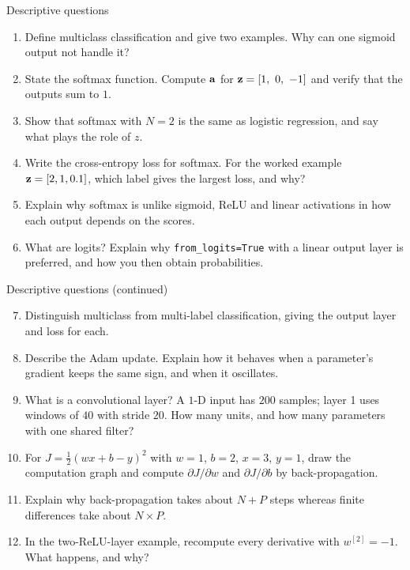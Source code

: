 \documentclass[aspectratio=169,10pt]{beamer}
\begin{document}
\begin{frame}{Descriptive questions}
  \footnotesize
  \begin{enumerate}
    \item Define multiclass classification and give two examples. Why can one sigmoid
          output not handle it? \hfill{}
    \item State the softmax function. Compute $\mathbf{a}$ for $\vz=[1,\ 0,\ -1]$ and verify that
          the outputs sum to $1$. \hfill{}
    \item Show that softmax with $N=2$ is the same as logistic regression, and say what
          plays the role of $z$. \hfill{}
    \item Write the cross-entropy loss for softmax. For the worked example
          $\mathbf{z}=[2,1,0.1]$, which label gives the largest loss, and why? \hfill{}
    \item Explain why softmax is unlike sigmoid, ReLU and linear activations in how each
          output depends on the scores. \hfill{}
    \item What are logits? Explain why \texttt{from\_logits=True} with a linear output layer
          is preferred, and how you then obtain probabilities. \hfill{}
  \end{enumerate}
\end{frame}

\begin{frame}{Descriptive questions (continued)}
  \footnotesize
  \begin{enumerate}\setcounter{enumi}{6}
    \item Distinguish multiclass from multi-label classification, giving the output layer
          and loss for each. \hfill{}
    \item Describe the Adam update. Explain how it behaves when a parameter's gradient
          keeps the same sign, and when it oscillates. \hfill{}
    \item What is a convolutional layer? A $1$-D input has $200$ samples; layer 1 uses
          windows of $40$ with stride $20$. How many units, and how many parameters with one
          shared filter? \hfill{}
    \item For $J=\tfrac12(wx+b-y)^2$ with $w=1$, $b=2$, $x=3$, $y=1$, draw the computation
          graph and compute $\partial J/\partial w$ and $\partial J/\partial b$ by
          back-propagation. \hfill{}
    \item Explain why back-propagation takes about $N+P$ steps whereas finite differences
          take about $N\times P$. \hfill{}
    \item In the two-ReLU-layer example, recompute every derivative with $w^{[2]}=-1$.
          What happens, and why? \hfill{}
  \end{enumerate}
\end{frame}
\end{document}

